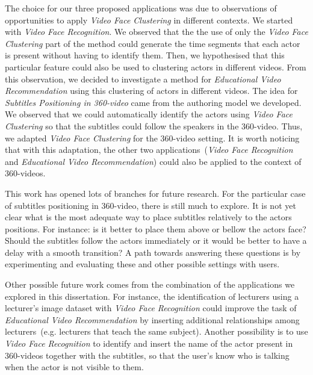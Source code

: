 The choice for our three proposed applications was due to observations of opportunities to apply \emph{Video Face Clustering} in different contexts. We started with \emph{Video Face Recognition}. We observed that the the use of only the \emph{Video Face Clustering} part of the method could generate the time segments that each actor is present without having to identify them. Then, we hypothesised that this particular feature could also be used to clustering actors in different videos. From this observation, we decided to investigate a method for \emph{Educational Video Recommendation} using this clustering of actors in different videos. The idea for \emph{Subtitles Positioning in 360-video} came from the authoring model we developed. We observed that we could automatically identify the actors using \emph{Video Face Clustering} so that the subtitles could follow the speakers in the 360-video. Thus, we adapted \emph{Video Face Clustering} for the 360-video setting. It is worth noticing that with this adaptation, the other two applications~(\emph{Video Face Recognition} and \emph{Educational Video Recommendation}) could also be applied to the context of 360-videos.

This work has opened lots of branches for future research. For the particular case of subtitles positioning in 360-video, there is still much to explore. It is not yet clear what is the most adequate way to place subtitles relatively to the actors positions. For instance: is it better to place them above or bellow the actors face? Should the subtitles follow the actors immediately or it would be better to have a delay with a smooth transition? A path towards answering these questions is by experimenting and evaluating these and other possible settings with users.

Other possible future work comes from the combination of the applications we explored in this dissertation. For instance, the identification of lecturers using a lecturer's image dataset with \emph{Video Face Recognition} could improve the task of \emph{Educational Video Recommendation} by inserting additional relationships among lecturers~(e.g. lecturers that teach the same subject). Another possibility is to use \emph{Video Face Recognition} to identify and insert the name of the actor present in 360-videos together with the subtitles, so that the user's know who is talking when the actor is not visible to them.

